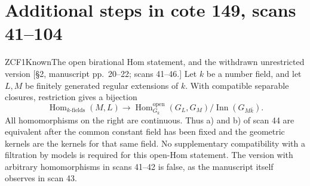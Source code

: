 \section{Additional steps in cote 149, scans 41--104}
\label{sec:ZCF}

\begin{result}{ZCF1}{Known}{The open birational Hom statement, and the withdrawn unrestricted version}
\textup{[\S2, manuscript pp.\ 20--22; scans 41--46.]}
Let $k$ be a number field, and let $L,M$ be finitely generated regular
extensions of $k$. With compatible separable closures, restriction gives
a bijection
\[
 \operatorname{Hom}_{k\text{-fields}}(M,L)
 \longrightarrow
 \operatorname{Hom}^{\mathrm{open}}_{G_k}(G_L,G_M)
             /\operatorname{Inn}(G_{M\bar k}).                 \tag{ZCF.1}
\]
All homomorphisms on the right are continuous. Thus a) and b) of
scan 44 are equivalent after the common constant field has been fixed
and the geometric kernels are the kernels for that same field.
No supplementary compatibility with a filtration by models is required
for this open-Hom statement. The version with arbitrary homomorphisms
in scans 41--42 is false, as the manuscript itself observes in scan 43.
\end{result}
